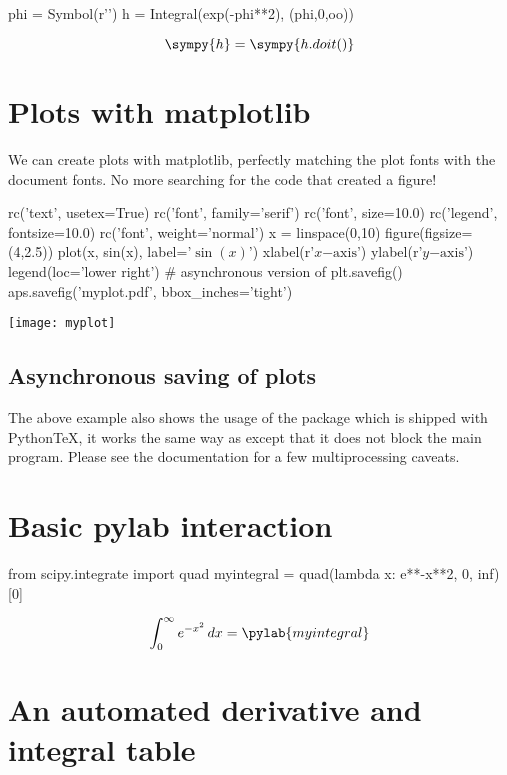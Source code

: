 \documentclass[11pt]{article}
\newcommand{\pytex}{Python\TeX}
\begin{document}
\begin{sympyblock}
phi = Symbol(r'\phi')
h = Integral(exp(-phi**2), (phi,0,oo))
\end{sympyblock}

\[\sympy{h}=\sympy{h.doit()}\]



\section{Plots with matplotlib}

We can create plots with matplotlib, perfectly matching the plot fonts with the document fonts.  No more searching for the code that created a figure!

\begin{pylabblock}
rc('text', usetex=True)
rc('font', family='serif')
rc('font', size=10.0)
rc('legend', fontsize=10.0)
rc('font', weight='normal')
x = linspace(0,10)
figure(figsize=(4,2.5))
plot(x, sin(x), label='$\sin(x)$')
xlabel(r'$x\mathrm{-axis}$')
ylabel(r'$y\mathrm{-axis}$')
legend(loc='lower right')
# asynchronous version of plt.savefig()
aps.savefig('myplot.pdf', bbox_inches='tight')
\end{pylabblock}

\begin{center}
\texttt{[image: myplot]}
\end{center}

\subsection{Asynchronous saving of plots}
The above example also shows the usage of the  package which is shipped with \pytex, it works
the same way as  except that it does not block the main program. Please see the documentation for
a few multiprocessing caveats.

\section{Basic pylab interaction}

\begin{pylabblock}
from scipy.integrate import quad
myintegral = quad(lambda x: e**-x**2, 0, inf)[0]
\end{pylabblock}

\[ \int_0^\infty e^{-x^2}\,dx = \pylab{myintegral} \]


\section{An automated derivative and integral table}
\end{document}
